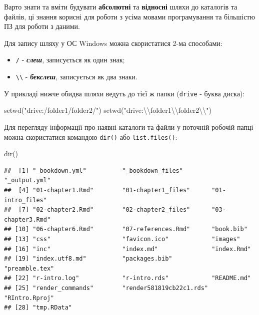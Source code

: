 \documentclass[
]{book}
\newenvironment{Shaded}{\begin{snugshade}}{\end{snugshade}}
\newcommand{\FunctionTok}[1]{\textcolor[rgb]{0.00,0.00,0.00}{#1}}
\newcommand{\NormalTok}[1]{#1}
\newcommand{\SpecialCharTok}[1]{\textcolor[rgb]{0.00,0.00,0.00}{#1}}
\newcommand{\StringTok}[1]{\textcolor[rgb]{0.31,0.60,0.02}{#1}}
\providecommand{\tightlist}{%
  \setlength{\itemsep}{0pt}\setlength{\parskip}{0pt}}
\begin{document}
Варто знати та вміти будувати \textbf{абсолютні} та \textbf{відносні} шляхи до каталогів та файлів, ці знання корисні для роботи з усіма мовами програмування та більшістю ПЗ для роботи з даними.

Для запису шляху у ОС Windows можна скористатися 2-ма способами:

\begin{itemize}
\tightlist
\item
  \texttt{/} - \textbf{\emph{слеш}}, записується як один знак;
\item
  \texttt{\textbackslash{}\textbackslash{}} - \textbf{\emph{бекслеш}}, записується як два знаки.
\end{itemize}

У прикладі нижче обидва шляхи ведуть до тієї ж папки (\texttt{drive} - буква диска):

\begin{Shaded}
\begin{Highlighting}[]
\FunctionTok{setwd}\NormalTok{(}\StringTok{"drive:/folder1/folder2/"}\NormalTok{)}
\FunctionTok{setwd}\NormalTok{(}\StringTok{"drive:}\SpecialCharTok{\textbackslash{}\textbackslash{}}\StringTok{folder1}\SpecialCharTok{\textbackslash{}\textbackslash{}}\StringTok{folder2}\SpecialCharTok{\textbackslash{}\textbackslash{}}\StringTok{"}\NormalTok{)}
\end{Highlighting}
\end{Shaded}

Для перегляду інформації про наявні каталоги та файли у поточній робочій папці можна скористатися командою \texttt{dir()} або \texttt{list.files()}:

\begin{Shaded}
\begin{Highlighting}[]
\FunctionTok{dir}\NormalTok{()}
\end{Highlighting}
\end{Shaded}

\begin{verbatim}
##  [1] "_bookdown.yml"          "_bookdown_files"        "_output.yml"           
##  [4] "01-chapter1.Rmd"        "01-chapter1_files"      "01-intro_files"        
##  [7] "02-chapter2.Rmd"        "02-chapter2_files"      "03-chapter3.Rmd"       
## [10] "06-chapter6.Rmd"        "07-references.Rmd"      "book.bib"              
## [13] "css"                    "favicon.ico"            "images"                
## [16] "inc"                    "index.md"               "index.Rmd"             
## [19] "index.utf8.md"          "packages.bib"           "preamble.tex"          
## [22] "r-intro.log"            "r-intro.rds"            "README.md"             
## [25] "render_commands"        "render581819cb22c1.rds" "RIntro.Rproj"          
## [28] "tmp.RData"
\end{verbatim}
\end{document}
